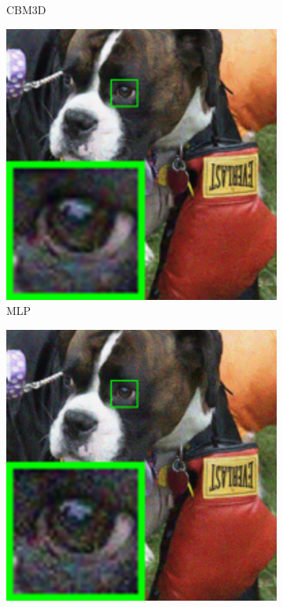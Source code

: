 \begin{figure}
\begin{subfigure}[t]{0.19\textwidth}
		\caption{CBM3D}
    \end{subfigure}
    \hfill
    \begin{subfigure}[t]{0.19\textwidth}
        \centering
        \includegraphics[width=1\textwidth]{images/mcwnnm/resize_br_MLP_dog.png}
\caption{MLP}
    \end{subfigure}
    \hfill
    \begin{subfigure}[t]{0.19\textwidth}
        \centering
        \includegraphics[width=1\textwidth]{images/mcwnnm/resize_br_TRD_dog.png}

\end{subfigure}
\end{figure}
